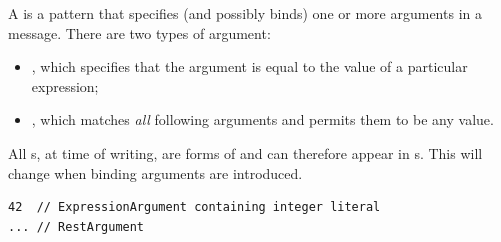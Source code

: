 A \margument{} is a pattern that specifies (and possibly binds) one or more
arguments in
a message.  There are two types of argument:

\begin{itemize}
\item
	\mexpressionargument, which specifies that the argument is equal to the
	value of a particular \robochart{} expression;
\item
	\mrestargument, which matches \emph{all} following arguments and permits
	them to be any value.
\end{itemize}

All \margument s, at time of writing, are forms of \mnonbindingargument{} and
can therefore appear in \mgapmessagespec s.  This will change when binding
arguments are introduced.

\begin{lstlisting}[style=Example]
42  // ExpressionArgument containing integer literal
... // RestArgument
\end{lstlisting}


